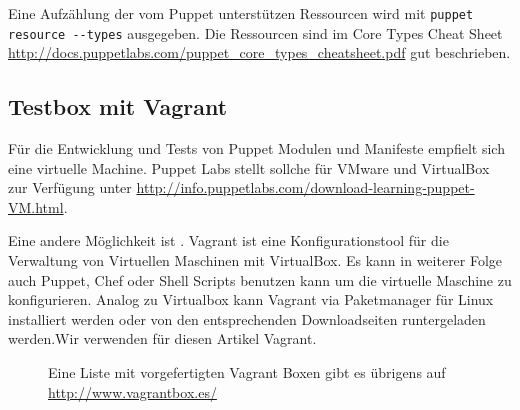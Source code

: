 \documentclass[12pt,a4paper,ngerman]{article}
\begin{document}
Eine Aufzählung der vom Puppet unterstützen Ressourcen wird mit \lstinline$puppet resource --types$ ausgegeben. Die Ressourcen sind im Core Types Cheat Sheet \url{http://docs.puppetlabs.com/puppet_core_types_cheatsheet.pdf} gut beschrieben.







\subsection{Testbox mit Vagrant}
Für die Entwicklung und Tests von Puppet Modulen und Manifeste empfielt sich eine virtuelle Machine. Puppet Labs stellt sollche für VMware und VirtualBox zur Verfügung unter \url{http://info.puppetlabs.com/download-learning-puppet-VM.html}. 

Eine andere Möglichkeit ist \cite{vagrant}. Vagrant ist eine Konfigurationstool für die Verwaltung von Virtuellen Maschinen mit VirtualBox. Es kann in weiterer Folge auch Puppet, Chef oder Shell Scripts benutzen kann um die virtuelle Maschine zu konfigurieren. Analog zu Virtualbox kann Vagrant via Paketmanager für Linux installiert werden oder von den entsprechenden Downloadseiten runtergeladen werden.Wir verwenden für diesen Artikel Vagrant. 

\begin{figure}
\vspace{-15pt}
\begin{boxedminipage}{5cm}
Eine Liste mit vorgefertigten Vagrant Boxen gibt es übrigens auf \url{http://www.vagrantbox.es/}
\end{boxedminipage}
\vspace{-15pt}
\end{figure}
\end{document}
